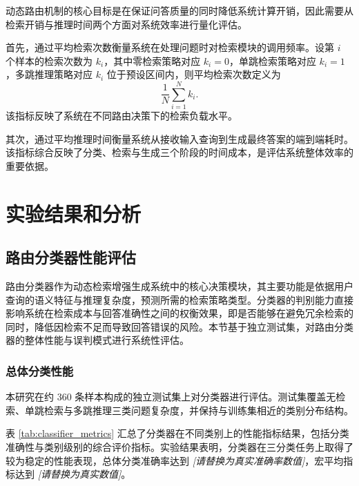 动态路由机制的核心目标是在保证问答质量的同时降低系统计算开销，因此需要从检索开销与推理时间两个方面对系统效率进行量化评估。

首先，通过平均检索次数衡量系统在处理问题时对检索模块的调用频率。设第 $i$ 个样本的检索次数为 $k_i$，其中零检索策略对应 $k_i=0$，单跳检索策略对应 $k_i=1$，多跳推理策略对应 $k_i$ 位于预设区间内，则平均检索次数定义为
\begin{equation}
\frac{1}{N}\sum_{i=1}^{N} k_i.
\end{equation}
该指标反映了系统在不同路由决策下的检索负载水平。

其次，通过平均推理时间衡量系统从接收输入查询到生成最终答案的端到端耗时。该指标综合反映了分类、检索与生成三个阶段的时间成本，是评估系统整体效率的重要依据。

\section{实验结果和分析}\label{ch03: exp_result}

\subsection{路由分类器性能评估}
\label{sec:classifier_performance}

路由分类器作为动态检索增强生成系统中的核心决策模块，其主要功能是依据用户查询的语义特征与推理复杂度，预测所需的检索策略类型。分类器的判别能力直接影响系统在检索成本与回答准确性之间的权衡效果，即是否能够在避免冗余检索的同时，降低因检索不足而导致回答错误的风险。本节基于独立测试集，对路由分类器的整体性能与误判模式进行系统性评估。

\subsubsection{总体分类性能}

本研究在约 360 条样本构成的独立测试集上对分类器进行评估。测试集覆盖无检索、单跳检索与多跳推理三类问题复杂度，并保持与训练集相近的类别分布结构。

表 \ref{tab:classifier_metrics} 汇总了分类器在不同类别上的性能指标结果，包括分类准确性与类别级别的综合评价指标。实验结果表明，分类器在三分类任务上取得了较为稳定的性能表现，总体分类准确率达到 \textit{[请替换为真实准确率数值]}，宏平均指标达到 \textit{[请替换为真实数值]}。

